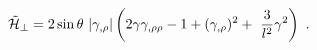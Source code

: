\begin{equation}
\tilde{{\cal H}}_\perp
= 2\sin\theta\   |\gamma_{,\rho}|  \left(2\gamma\gamma_{,\rho\rho} - 1 + (\gamma_{ ,\rho})^2 + \
\frac{3}{l^2}\gamma^2\right)  \ .
\label{cons}
\end{equation}

